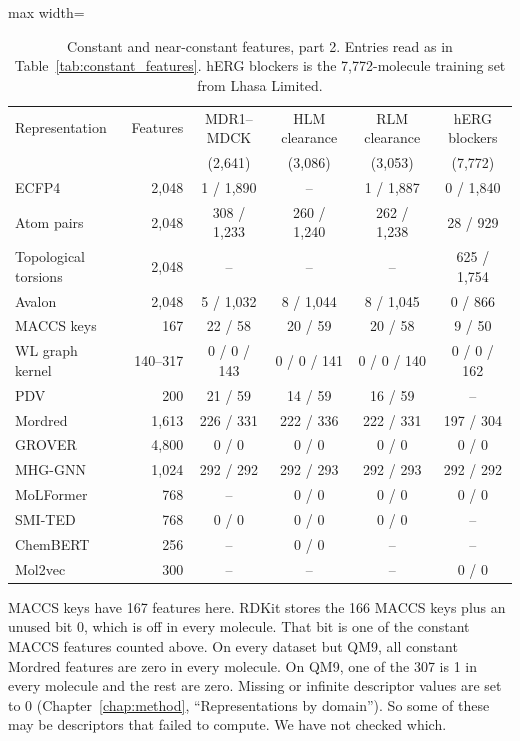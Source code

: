 \begin{table}[htbp]
\centering
\small
\setlength{\tabcolsep}{4pt}
\caption[Constant and near-constant features, part 2.]{Constant and near-constant features, part 2. Entries read as in Table~\ref{tab:constant_features}. hERG blockers is the 7,772-molecule training set from Lhasa Limited.}
\label{tab:constant_features_b}
\begin{adjustbox}{max width=\textwidth}
\begin{tabular}{lrcccc}
\toprule
Representation & Features & MDR1--MDCK & HLM clearance & RLM clearance & hERG blockers \\
 & & (2,641) & (3,086) & (3,053) & (7,772) \\
\midrule
ECFP4 & 2,048 & 1 / 1,890 & -- & 1 / 1,887 & 0 / 1,840 \\
Atom pairs & 2,048 & 308 / 1,233 & 260 / 1,240 & 262 / 1,238 & 28 / 929 \\
Topological torsions & 2,048 & -- & -- & -- & 625 / 1,754 \\
Avalon & 2,048 & 5 / 1,032 & 8 / 1,044 & 8 / 1,045 & 0 / 866 \\
MACCS keys & 167 & 22 / 58 & 20 / 59 & 20 / 58 & 9 / 50 \\
WL graph kernel & 140--317 & 0 / 0 / 143 & 0 / 0 / 141 & 0 / 0 / 140 & 0 / 0 / 162 \\
PDV & 200 & 21 / 59 & 14 / 59 & 16 / 59 & -- \\
Mordred & 1,613 & 226 / 331 & 222 / 336 & 222 / 331 & 197 / 304 \\
GROVER & 4,800 & 0 / 0 & 0 / 0 & 0 / 0 & 0 / 0 \\
MHG-GNN & 1,024 & 292 / 292 & 292 / 293 & 292 / 293 & 292 / 292 \\
MoLFormer & 768 & -- & 0 / 0 & 0 / 0 & 0 / 0 \\
SMI-TED & 768 & 0 / 0 & 0 / 0 & 0 / 0 & -- \\
ChemBERT & 256 & -- & 0 / 0 & -- & -- \\
Mol2vec & 300 & -- & -- & -- & 0 / 0 \\
\bottomrule
\end{tabular}
\end{adjustbox}
\end{table}

MACCS keys have 167 features here. RDKit stores the 166 MACCS keys plus an unused bit 0, which is off in every molecule. That bit is one of the constant MACCS features counted above. On every dataset but QM9, all constant Mordred features are zero in every molecule. On QM9, one of the 307 is 1 in every molecule and the rest are zero. Missing or infinite descriptor values are set to 0 (Chapter~\ref{chap:method}, ``Representations by domain''). So some of these may be descriptors that failed to compute. We have not checked which.

